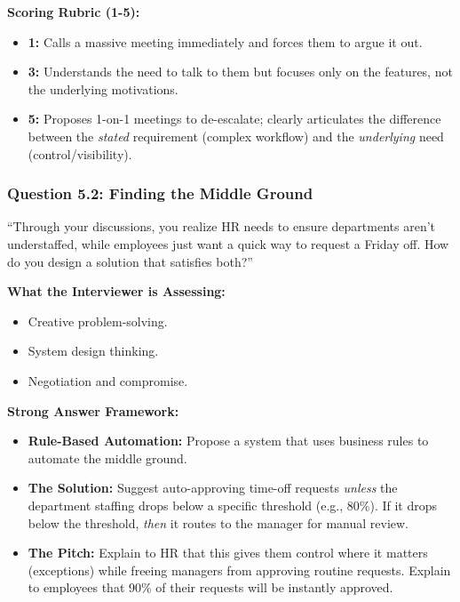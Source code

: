 \documentclass[
  11pt,
  openany,
  oneside]{book}
\providecommand{\tightlist}{%
  \setlength{\itemsep}{0pt}\setlength{\parskip}{0pt}}
\begin{document}
\textbf{Scoring Rubric (1-5):}

\begin{itemize}
\tightlist
\item
  \textbf{1:} Calls a massive meeting immediately and forces them to
  argue it out.
\item
  \textbf{3:} Understands the need to talk to them but focuses only on
  the features, not the underlying motivations.
\item
  \textbf{5:} Proposes 1-on-1 meetings to de-escalate; clearly
  articulates the difference between the \emph{stated} requirement
  (complex workflow) and the \emph{underlying} need
  (control/visibility).
\end{itemize}

\subsubsection{Question 5.2: Finding the Middle
Ground}\label{question-5.2-finding-the-middle-ground}

``Through your discussions, you realize HR needs to ensure departments
aren't understaffed, while employees just want a quick way to request a
Friday off. How do you design a solution that satisfies both?''

\textbf{What the Interviewer is Assessing:}

\begin{itemize}
\tightlist
\item
  Creative problem-solving.
\item
  System design thinking.
\item
  Negotiation and compromise.
\end{itemize}

\textbf{Strong Answer Framework:}

\begin{itemize}
\tightlist
\item
  \textbf{Rule-Based Automation:} Propose a system that uses business
  rules to automate the middle ground.
\item
  \textbf{The Solution:} Suggest auto-approving time-off requests
  \emph{unless} the department staffing drops below a specific threshold
  (e.g., 80\%). If it drops below the threshold, \emph{then} it routes
  to the manager for manual review.
\item
  \textbf{The Pitch:} Explain to HR that this gives them control where
  it matters (exceptions) while freeing managers from approving routine
  requests. Explain to employees that 90\% of their requests will be
  instantly approved.
\end{itemize}
\end{document}
